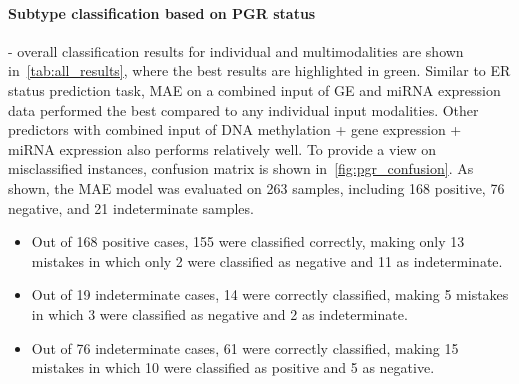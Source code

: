 \paragraph{Subtype classification based on PGR status} - overall classification results for individual and multimodalities are shown in~\cref{tab:all_results}, where the best results are highlighted in green. Similar to ER status prediction task, MAE on a combined input of GE and miRNA expression data performed the best compared to any individual input modalities. Other predictors with combined input of DNA methylation + gene expression + miRNA expression also performs relatively well. To provide a view on misclassified instances, confusion matrix is shown in~\cref{fig:pgr_confusion}. As shown, the MAE model was evaluated on 263 samples, including 168 positive, 76 negative, and 21 indeterminate samples. 

\begin{itemize}[noitemsep]
    \item Out of 168 positive cases, 155 were classified correctly, making only 13 mistakes in which only 2 were classified as negative and 11 as indeterminate. 

    \item Out of 19 indeterminate cases, 14 were correctly classified, making 5 mistakes in which 3 were classified as negative and 2 as indeterminate. 

    \item Out of 76 indeterminate cases, 61 were correctly classified, making 15 mistakes in which 10 were classified as positive and 5 as negative.  
\end{itemize}

